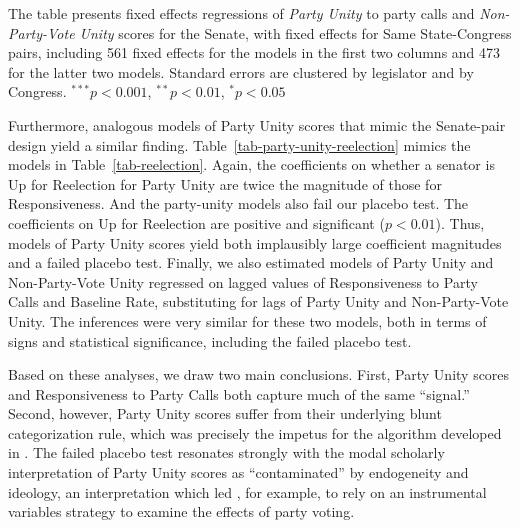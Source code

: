 \documentclass[12pt]{article}
\begin{document}
\begin{table}[!htbp]
{\begin{threeparttable}
\begin{tabular}{l c c c c }
\hline
\end{tabular}

\begin{tablenotes}
   \item
   The table presents fixed effects regressions of \textit{Party Unity} to
   party calls and \textit {Non-Party-Vote Unity} scores for the Senate, with
   fixed effects for Same State-Congress pairs, including 561 fixed effects
   for the models in the first two columns and 473 for the latter two models.
   Standard errors are clustered by legislator and by Congress.
   $^{***}p<0.001$, $^{**}p<0.01$, $^*p<0.05$
 \end{tablenotes}
\end{threeparttable}
}
\end{table}

Furthermore, analogous models of Party Unity scores that mimic the Senate-pair
design yield a similar finding.
Table~\ref{tab-party-unity-reelection} mimics the models in
Table~\ref{tab-reelection}.
Again, the coefficients on whether a senator is Up for Reelection for
Party Unity are twice the
magnitude of those for Responsiveness.
And the party-unity models also fail our placebo test.
The coefficients on Up for Reelection are positive and significant
($p < 0.01$).
Thus, models of Party Unity scores yield both implausibly large coefficient
magnitudes and a failed placebo test.
Finally, we also estimated models of Party Unity and Non-Party-Vote Unity
regressed on lagged values of Responsiveness to Party Calls and Baseline Rate,
substituting for lags of Party Unity and Non-Party-Vote Unity.
The inferences were very similar for these two models, both in terms of
signs and statistical significance, including the failed placebo test.

Based on these analyses, we draw two main conclusions.
First, Party Unity scores and Responsiveness to Party Calls both capture much of
the same ``signal.''
Second, however, Party Unity scores suffer from their underlying blunt
categorization rule, which was precisely the impetus for the algorithm
developed in \cite{Minozzi:2013}. The failed placebo test resonates strongly
with the modal scholarly interpretation of
Party Unity scores as ``contaminated'' by endogeneity and ideology,
an interpretation which led \cite{Carson:2010}, for example, to rely on an
instrumental variables strategy to examine the effects of party voting.

\clearpage

\singlespacing


\end{document}
